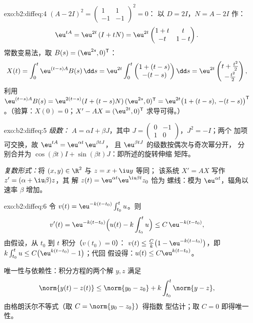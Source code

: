 \begin{solution}{exo:b2:diffeq:4}
$(A - 2I)^2 = \begin{pmatrix}1 & 1\\ -1 & -1\end{pmatrix}^2 = 0$：
以 $D = 2I$，$N = A - 2I$ 作：
\[
\eu^{tA} = \eu^{2t}\,(I + tN)
= \eu^{2t}\begin{pmatrix} 1 + t & t\\ -t & 1 - t\end{pmatrix}.
\]
常数变易法，取 $B(s) = (\eu^{2s}, 0)^{\mathsf T}$：
\[
X(t) = \int_0^t \eu^{(t-s)A}B(s)\,\dd s
= \eu^{2t}\int_0^t \begin{pmatrix} 1 + (t-s)\\ -(t-s)
\end{pmatrix}\dd s
= \eu^{2t}\begin{pmatrix} t + \frac{t^2}{2}\\[2pt] -\frac{t^2}{2}
\end{pmatrix},
\]
利用 $\eu^{(t-s)A}B(s) = \eu^{2(t-s)}(I + (t-s)N)\,(\eu^{2s},
0)^{\mathsf T} = \eu^{2t}\bigl(1 + (t-s),\, -(t-s)\bigr)^{\mathsf
T}$。（验算：$X(0) = 0$；$X' - AX = (\eu^{2t}, 0)^{\mathsf T}$
求导可得。）
\end{solution}

\begin{solution}{exo:b2:diffeq:5}
\emph{级数：} $A = \alpha I + \beta J$，其中 $J =
\begin{pmatrix}0 & -1\\ 1 & 0\end{pmatrix}$，$J^2 = -I$；两个
加项可交换，故 $\eu^{tA} = \eu^{\alpha t}\,\eu^{\beta tJ}$，
且 $\eu^{\beta t J}$ 的级数按偶次与奇次幂分开，
分别合并为 $\cos(\beta t)I + \sin(\beta t)J$：即所述的旋转伸缩
矩阵。

\emph{复数形式：}将 $(x, y) \in \R^2$ 与 $z = x + \iu y$ 等同；
该系统 $X' = AX$ 写作 $z' = (\alpha + \iu\beta)z$，其
解 $z(t) = \eu^{\alpha t}\eu^{\iu\beta t}z_0$ 恰为
螺线：模为 $\eu^{\alpha t}$，辐角以速率
$\beta$ 增加。
\end{solution}

\begin{solution}{exo:b2:diffeq:6}
令 $v(t) = \eu^{-k(t - t_0)}\int_{t_0}^t u$。则
\[
v'(t) = \eu^{-k(t-t_0)}\Bigl(u(t) - k\int_{t_0}^t u\Bigr)
\leq C\,\eu^{-k(t-t_0)},
\]
由假设，从 $t_0$ 到 $t$ 积分（$v(t_0) = 0$）：
$v(t) \leq \frac{C}{k}\bigl(1 - \eu^{-k(t - t_0)}\bigr)$，即
$k\int_{t_0}^t u \leq C\bigl(\eu^{k(t-t_0)} - 1\bigr)$；代回
假设得：$u(t) \leq C\eu^{k(t-t_0)}$。

唯一性与依赖性：积分方程的两个解 $y, z$
满足
\[
\norm{y(t) - z(t)} \leq \norm{y_0 - z_0} +
k\int_{t_0}^{t}\norm{y - z},
\]
由格朗沃尔不等式（取 $C = \norm{y_0 - z_0}$）得指数
型估计；取 $C = 0$ 即得唯一性。
\end{solution}

